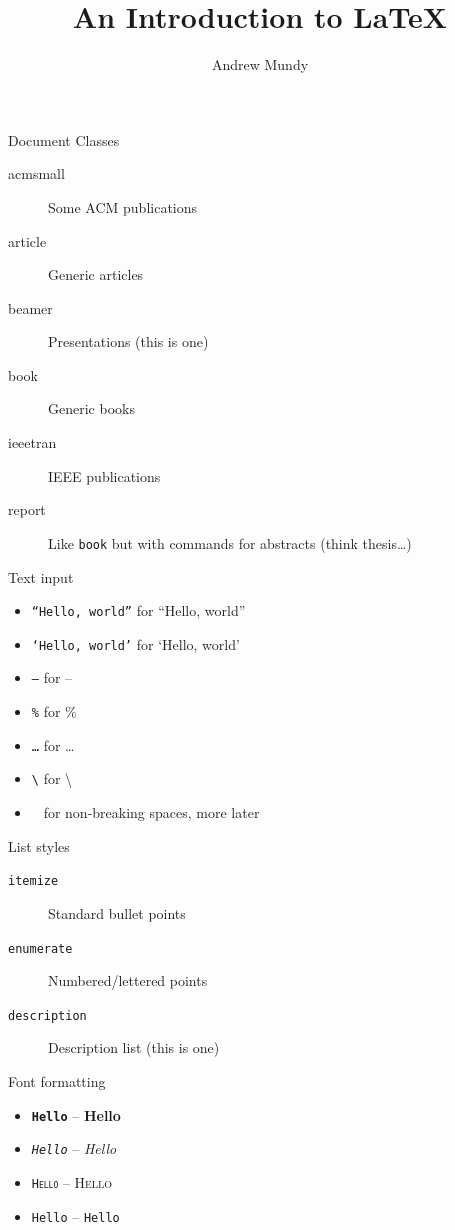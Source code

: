 \documentclass[t]{beamer}
\title{An Introduction to \LaTeX{}}
\author{Andrew Mundy}
\begin{document}
\maketitle

\begin{frame}{Document Classes}
  \begin{description}
    \item[acmsmall] Some ACM publications
    \item[article] Generic articles
    \item[beamer] Presentations (this is one)
    \item[book] Generic books
    \item[ieeetran] IEEE publications
    \item[report] Like \texttt{book} but with commands for abstracts (think thesis\ldots)
  \end{description}
\end{frame}

\begin{frame}{Text input}
  \begin{itemize}
    \item \texttt{``Hello, world''} for ``Hello, world''
    \item \texttt{`Hello, world'} for `Hello, world'
    \item \texttt{--} for --
    \item \texttt{\%} for \%
    \item \texttt{\ldots} for \ldots
    \item \texttt{\textbackslash} for \textbackslash
    \item \texttt{~} for non-breaking spaces, more later
  \end{itemize}
\end{frame}

\begin{frame}{List styles}
  \begin{description}
    \item[\texttt{itemize}] Standard bullet points
    \item[\texttt{enumerate}] Numbered/lettered points
    \item[\texttt{description}] Description list (this is one)
  \end{description}
\end{frame}

\begin{frame}{Font formatting}
  \begin{itemize}
    \item \texttt{\textbf{Hello}} -- \textbf{Hello}
    \item \texttt{\textit{Hello}} -- \textit{Hello}
    \item \texttt{\textsc{Hello}} -- \textsc{Hello}
    \item \texttt{\texttt{Hello}} -- \texttt{Hello}
  \end{itemize}
\end{frame}
\end{document}
